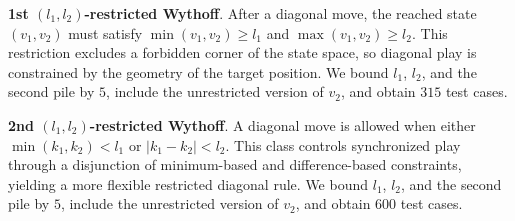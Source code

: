 \documentclass[review]{elsarticle}
\newcommand{\set}[1]{\{ #1 \}}
\newcommand{\tuple}[1]{\langle {#1} \rangle}
\newcommand{\true}{\top}
\newcommand{\statevar}{\mathcal{X}}
\newcommand{\act}{\mathcal{A}}
\newcommand{\constraint}{\mathcal{C}}
\newcommand{\estate}{\mathcal{E}}
\newcommand{\pre}{\mathtt{pre}}
\newcommand{\eff}{\mathtt{eff}}
\begin{document}
{\color{red}\textbf{1st $(l_1, l_2)$-restricted Wythoff}. After a diagonal move, the reached state $(v_1,v_2)$ must satisfy $\min(v_1,v_2) \ge l_1$ and $\max(v_1,v_2) \ge l_2$.}
{\color{red}This restriction excludes a forbidden corner of the state space, so diagonal play is constrained by the geometry of the target position.}
{\color{red}We bound $l_1$, $l_2$, and the second pile by $5$, include the unrestricted version of $v_2$, and obtain $315$ test cases.}

{\color{red}\textbf{2nd $(l_1,l_2)$-restricted Wythoff}. A diagonal move is allowed when either $\min(k_1,k_2) < l_1$ or $|k_1-k_2| < l_2$.}
{\color{red}This class controls synchronized play through a disjunction of minimum-based and difference-based constraints, yielding a more flexible restricted diagonal rule.}
{\color{red}We bound $l_1$, $l_2$, and the second pile by $5$, include the unrestricted version of $v_2$, and obtain $600$ test cases.}
\end{document}
